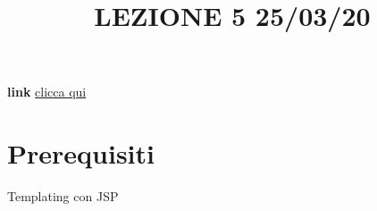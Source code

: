 \title{LEZIONE 5 25/03/20}\newline
\textbf{link} \href{https://web.microsoftstream.com/video/2534f028-dc3d-4987-9905-66f2994ce127}{clicca qui}
\section*{Prerequisiti}
Templating con JSP
\section{}